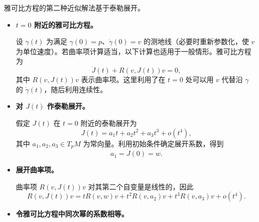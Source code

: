 雅可比方程的第二种近似解法基于泰勒展开。
\begin{itemize}
\item \textbf{$t=0$ 附近的雅可比方程。}

设 $\gamma(t)$ 为满足 $\gamma(0)=p$、$\dot\gamma(0)=v$ 的测地线（必要时重新参数化，使 $v$ 为单位速度）。若曲率项计算适当，以下计算也适用于一般情形。雅可比方程为
\begin{equation*}
  \ddot J(t)+R(v,J(t))v=0,
  \tag{6E39}\label{eq:6E39}
\end{equation*}
其中 $R(v,J(t))v$ 表示曲率项。这里利用了在 $t=0$ 处可以用 $v$ 代替沿 $\gamma$ 的 $\dot\gamma(t)$，随后利用连续性。
\item \textbf{对 $J(t)$ 作泰勒展开。}

假定 $J(t)$ 在 $t=0$ 附近的泰勒展开为
\begin{equation*}
  J(t)=a_1t+a_2t^2+a_3t^3+o(t^4),
  \tag{6E40}\label{eq:6E40}
\end{equation*}
其中 $a_1,a_2,a_3\in T_pM$ 为常向量。利用初始条件确定展开系数，得到
\[
  a_1=\dot J(0)=w.
\]
\item \textbf{展开曲率项。}

曲率项 $R(v,J(t))v$ 对其第二个自变量是线性的，因此
\begin{equation*}
  R(v,J(t))v=tR(v,w)v+t^2R(v,a_2)v+t^3R(v,a_3)v+o(t^4).
  \tag{6E41}\label{eq:6E41}
\end{equation*}
\item \textbf{令雅可比方程中同次幂的系数相等。}


\end{itemize}
